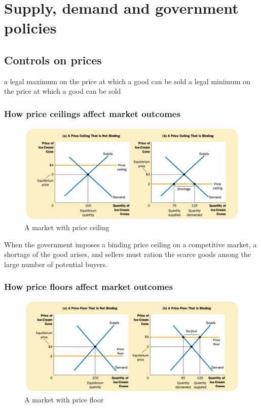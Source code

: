 
\chapter{Supply, demand and government policies}

\section{Controls on prices}

\begin{tcolorbox}
  a legal maximum on the price at which a good can be sold
  a legal minimum on the price at which a good can be sold
\end{tcolorbox}

\subsection{How price ceilings affect market outcomes}

\begin{figure}[!ht]
  \centering
  \includegraphics[width=\textwidth]{pics/price-ceiling}
  \caption{A market with price ceiling}
  \label{fig:price-ceiling}
\end{figure}

When the government imposes a binding price ceiling on a competitive market, a shortage of the good arises, and sellers must ration the scarce goods among the large number of potential buyers.


\subsection{How price floors affect market outcomes}


\begin{figure}[!ht]
  \centering
  \includegraphics[width=\textwidth]{pics/price-floor}
  \caption{A market with price floor}
  \label{fig:price-floor}
\end{figure}


